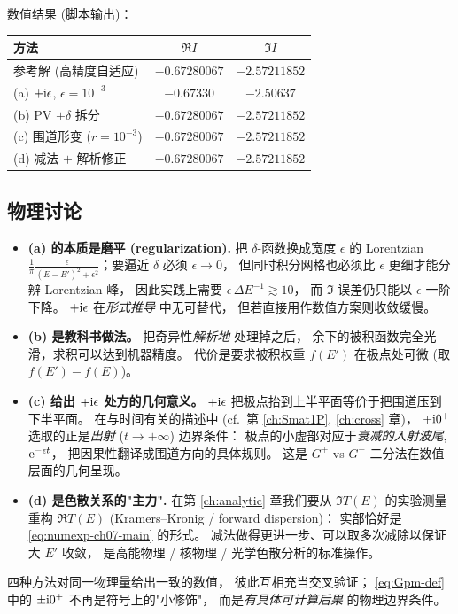 数值结果 (脚本输出)：
\begin{center}\small
\begin{tabular}{lcc}
\hline
方法 & $\Re I$ & $\Im I$ \\
\hline
参考解 (高精度自适应)             & $-0.67280067$ & $-2.57211852$ \\
(a) $+\mathrm{i}\epsilon$, $\epsilon=10^{-3}$ & $-0.67330$    & $-2.50637$    \\
(b) PV $+\delta$ 拆分              & $-0.67280067$ & $-2.57211852$ \\
(c) 围道形变 ($r=10^{-3}$)        & $-0.67280067$ & $-2.57211852$ \\
(d) 减法 $+$ 解析修正              & $-0.67280067$ & $-2.57211852$ \\
\hline
\end{tabular}
\end{center}

\subsection*{物理讨论}

\begin{itemize}
  \item \textbf{(a) 的本质是磨平 (regularization).}
        把 $\delta$-函数换成宽度 $\epsilon$ 的 Lorentzian
        $\frac{1}{\pi}\frac{\epsilon}{(E-E')^2+\epsilon^2}$；要逼近 $\delta$ 必须 $\epsilon\to 0$，
        但同时积分网格也必须比 $\epsilon$ 更细才能分辨 Lorentzian 峰，
        因此实践上需要 $\epsilon\,\Delta E^{-1}\gtrsim 10$，
        而 $\Im$ 误差仍只能以 $\epsilon$ 一阶下降。
        $+\mathrm{i}\epsilon$ 在\emph{形式推导} 中无可替代，
        但若直接用作数值方案则收敛缓慢。
  \item \textbf{(b) 是教科书做法。}
        把奇异性\emph{解析地} 处理掉之后，
        余下的被积函数完全光滑，求积可以达到机器精度。
        代价是要求被积权重 $f(E')$ 在极点处可微 (取 $f(E')-f(E)$)。
  \item \textbf{(c) 给出 $+\mathrm{i}\epsilon$ 处方的几何意义。}
        $+\mathrm{i}\epsilon$ 把极点抬到上半平面等价于把围道压到下半平面。
        在与时间有关的描述中 (cf.\ 第 \ref{ch:Smat1P}, \ref{ch:cross} 章)，
        $+\mathrm{i} 0^+$ 选取的正是\emph{出射} ($t\to+\infty$) 边界条件：
        极点的小虚部对应于\emph{衰减的入射波尾}, $\mathrm{e}^{-\epsilon t}$，
        把因果性翻译成围道方向的具体规则。
        这是 $G^+$ vs $G^-$ 二分法在数值层面的几何呈现。
  \item \textbf{(d) 是色散关系的"主力".}
        在第 \ref{ch:analytic} 章我们要从 $\Im T(E)$ 的实验测量
        重构 $\Re T(E)$ (Kramers--Kronig / forward dispersion)：
        实部恰好是 \eqref{eq:numexp-ch07-main} 的形式。
        减法做得更进一步、可以取多次减除以保证大 $E'$ 收敛，
        是高能物理 / 核物理 / 光学色散分析的标准操作。
\end{itemize}

四种方法对同一物理量给出一致的数值，
彼此互相充当交叉验证；
\eqref{eq:Gpm-def} 中的 $\pm\mathrm{i} 0^+$ 不再是符号上的"小修饰"，
而是\emph{有具体可计算后果} 的物理边界条件。
